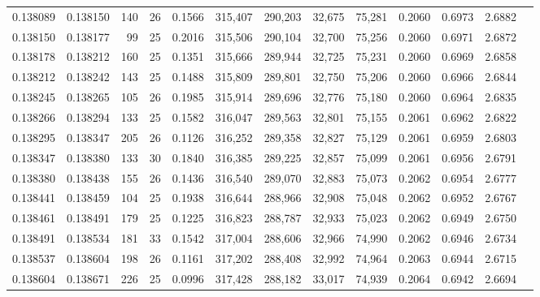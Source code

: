 \begin{tabular}{rrrrrrrrrrrrr}
0.138089 & 0.138150 & 140 &  26 &                                     0.1566 & 315,407 & 290,203 &  32,675 &  75,281 & 0.2060 & 0.6973 & 2.6882 \\
0.138150 & 0.138177 &  99 &  25 &                                     0.2016 & 315,506 & 290,104 &  32,700 &  75,256 & 0.2060 & 0.6971 & 2.6872 \\
0.138178 & 0.138212 & 160 &  25 &                                     0.1351 & 315,666 & 289,944 &  32,725 &  75,231 & 0.2060 & 0.6969 & 2.6858 \\
0.138212 & 0.138242 & 143 &  25 &                                     0.1488 & 315,809 & 289,801 &  32,750 &  75,206 & 0.2060 & 0.6966 & 2.6844 \\
0.138245 & 0.138265 & 105 &  26 &                                     0.1985 & 315,914 & 289,696 &  32,776 &  75,180 & 0.2060 & 0.6964 & 2.6835 \\
0.138266 & 0.138294 & 133 &  25 &                                     0.1582 & 316,047 & 289,563 &  32,801 &  75,155 & 0.2061 & 0.6962 & 2.6822 \\
0.138295 & 0.138347 & 205 &  26 &                                     0.1126 & 316,252 & 289,358 &  32,827 &  75,129 & 0.2061 & 0.6959 & 2.6803 \\
0.138347 & 0.138380 & 133 &  30 &                                     0.1840 & 316,385 & 289,225 &  32,857 &  75,099 & 0.2061 & 0.6956 & 2.6791 \\
0.138380 & 0.138438 & 155 &  26 &                                     0.1436 & 316,540 & 289,070 &  32,883 &  75,073 & 0.2062 & 0.6954 & 2.6777 \\
0.138441 & 0.138459 & 104 &  25 &                                     0.1938 & 316,644 & 288,966 &  32,908 &  75,048 & 0.2062 & 0.6952 & 2.6767 \\
0.138461 & 0.138491 & 179 &  25 &                                     0.1225 & 316,823 & 288,787 &  32,933 &  75,023 & 0.2062 & 0.6949 & 2.6750 \\
0.138491 & 0.138534 & 181 &  33 &                                     0.1542 & 317,004 & 288,606 &  32,966 &  74,990 & 0.2062 & 0.6946 & 2.6734 \\
0.138537 & 0.138604 & 198 &  26 &                                     0.1161 & 317,202 & 288,408 &  32,992 &  74,964 & 0.2063 & 0.6944 & 2.6715 \\
0.138604 & 0.138671 & 226 &  25 &                                     0.0996 & 317,428 & 288,182 &  33,017 &  74,939 & 0.2064 & 0.6942 & 2.6694 \\

\end{tabular}
